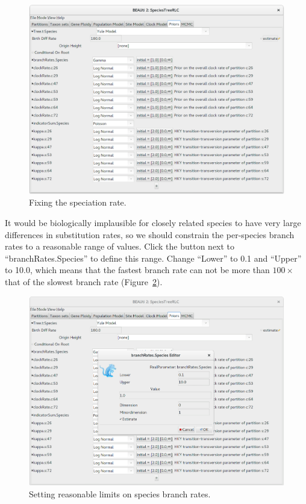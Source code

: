 \documentclass{article}
\begin{document}
\begin{figure}[htb!]
\centering
\includegraphics[width=\textwidth]{figures/beauti-yule.png}
\caption{Fixing the speciation rate.}
\label{fig:yule}
\end{figure}

It would be biologically implausible for closely related species to have very large
differences in substitution rates, so we should constrain the per-species branch
rates to a reasonable range of values. Click the button next to
``branchRates.Species'' to define this range. Change ``Lower'' to 0.1 and
``Upper'' to 10.0, which means that the fastest branch rate can not be more than
$100\times$ that of the slowest branch rate (Figure~\ref{fig:limits}).

\begin{figure}[htb!]
\centering
\includegraphics[width=\textwidth]{figures/beauti-branch-rates.png}
\caption{Setting reasonable limits on species branch rates.}
\label{fig:limits}
\end{figure}
\end{document}
